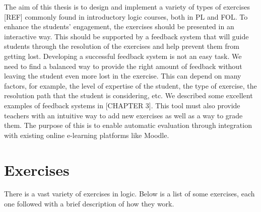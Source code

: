 The aim of this thesis is to design and implement a variety of types of exercises [REF] commonly found in introductory logic courses, both in PL and FOL. To enhance the students' engagement, the exercises should be presented in an interactive way. This should be supported by a feedback system that will guide students through the resolution of the exercises and help prevent them from getting lost. Developing a successful feedback system is not an easy task. We need to find a balanced way to provide the right amount of feedback without leaving the student even more lost in the exercise. This can depend on many factors, for example, the level of expertise of the student, the type of exercise, the resolution path that the student is considering, etc. We described some excellent examples of feedback systems in [CHAPTER 3]. This tool must also provide teachers with an intuitive way to add new exercises as well as a way to grade them. The purpose of this is to enable automatic evaluation through integration with existing online e-learning platforms like Moodle.

\section{Exercises}

There is a vast variety of exercises in logic. Below is a list of some exercises, each one followed with a brief description of how they work. %


